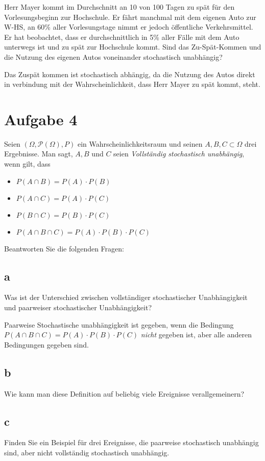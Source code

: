 Herr Mayer kommt im Durchschnitt an 10 von 100 Tagen zu spät für den Vorlesungsbeginn zur Hochschule. Er fährt manchmal mit dem eigenen Auto zur W-HS, an 60\% aller Vorlesungstage nimmt er jedoch öffentliche Verkehrsmittel. Er hat beobachtet, dass er durchschnittlich in 5\% aller Fälle mit dem Auto unterwegs ist und zu spät zur Hochschule kommt. Sind das Zu-Spät-Kommen und die Nutzung des eigenen Autos voneinander stochastisch unabhängig?

Das Zuspät kommen ist stochastisch abhängig, da die Nutzung des Autos direkt in verbindung mit der Wahrscheinlichkeit, dass Herr Mayer zu spät kommt, steht.

\section{Aufgabe 4}

Seien $(\Omega, \mathcal{P}(\Omega), P)$ ein Wahrscheinlichkeitsraum und seinen $A, B, C \subset \Omega$ drei Ergebnisse. Man sagt, $A, B$ und $C$ seien \textit{Vollständig stochastisch unabhängig}, wenn gilt, dass

\begin{itemize}
    \item $P(A \cap B) = P(A) \cdot P(B)$
    \item $P(A \cap C) = P(A) \cdot P(C)$
    \item $P(B \cap C) = P(B) \cdot P(C)$
    \item $P(A \cap B \cap C) = P(A) \cdot P(B) \cdot P(C)$
\end{itemize}

Beantworten Sie die folgenden Fragen:

\subsection{a}

Was ist der Unterschied zwischen vollständiger stochastischer Unabhängigkeit und paarweiser stochastischer Unabhängigkeit?

Paarweise Stochastische unabhängigkeit ist gegeben, wenn die Bedingung $P(A \cap B \cap C) = P(A) \cdot P(B) \cdot P(C)$ \textit{nicht} gegeben ist, aber alle anderen Bedingungen gegeben sind.

\subsection{b}

Wie kann man diese Definition auf beliebig viele Ereignisse verallgemeinern?

\subsection{c}

Finden Sie ein Beispiel für drei Ereignisse, die paarweise stochastisch unabhängig sind, aber nicht vollständig stochastisch unabhängig.
